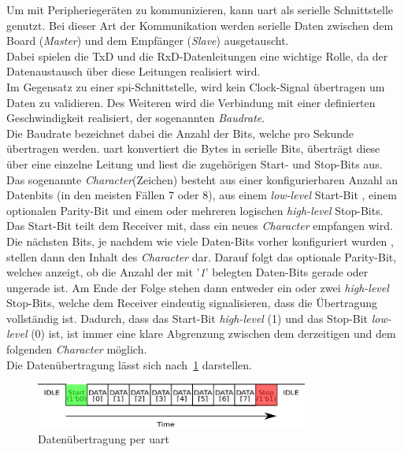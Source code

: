Um mit Peripheriegeräten zu kommunizieren, kann \ac{uart} als serielle Schnittstelle genutzt.
Bei dieser Art der Kommunikation werden serielle Daten zwischen dem Board (\emph{Master})
und dem Empfänger (\emph{Slave}) ausgetauscht. \\
Dabei spielen die TxD und die RxD-Datenleitungen
eine wichtige Rolle, da der Datenaustausch über diese Leitungen realisiert wird.\\
Im Gegensatz zu einer \ac{spi}-Schnittstelle, wird kein Clock-Signal
übertragen um Daten zu validieren. Des Weiteren wird die Verbindung mit einer definierten
Geschwindigkeit realisiert, der sogenannten \emph{Baudrate}. \cite{uartpdf} \\
Die Baudrate bezeichnet dabei die Anzahl der Bits, welche pro Sekunde übertragen werden.
\ac{uart} konvertiert die Bytes in serielle Bits, überträgt diese über eine einzelne Leitung
und liest die zugehörigen Start- und Stop-Bits aus.\\
Das sogenannte \emph{Character}(Zeichen) besteht aus einer konfigurierbaren Anzahl an Datenbits (in den meisten
Fällen 7 oder 8), aus einem \emph{low-level} Start-Bit , einem optionalen Parity-Bit und einem
oder mehreren logischen \emph{high-level} Stop-Bits.\\
Das Start-Bit teilt dem Receiver mit, dass ein neues \emph{Character} empfangen wird.
Die nächsten Bits, je nachdem wie viele Daten-Bits vorher konfiguriert wurden , stellen
dann den Inhalt des \emph{Character} dar. Darauf folgt das optionale Parity-Bit,
welches anzeigt, ob die Anzahl der mit '\emph{1}' belegten Daten-Bits gerade oder
ungerade ist. Am Ende der Folge stehen dann entweder ein oder zwei  \emph{high-level } Stop-Bits,
welche dem Receiver eindeutig signalisieren, dass die Übertragung vollständig ist. Dadurch,
dass das Start-Bit \emph{high-level} (1) und das Stop-Bit \emph{low-level} (0) ist,
ist immer eine klare Abgrenzung zwischen dem derzeitigen und dem folgenden \emph{Character} möglich.\\

Die Datenübertragung lässt sich nach~\ref{fig:uart} darstellen.\\

\begin{figure}[h!]
\centering
\includegraphics[width=0.8\textwidth]{Hauptteil/uart.eps}
\caption{Datenübertragung per \ac{uart} }
\label{fig:uart}
\end{figure}


